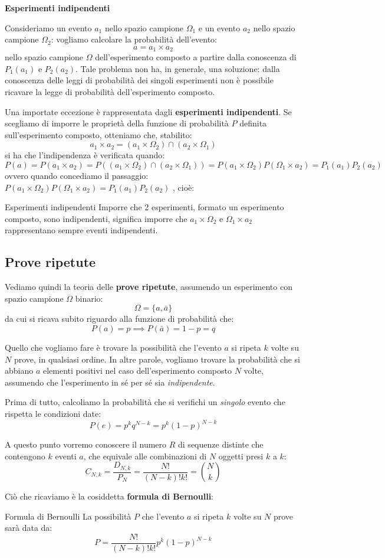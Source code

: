 \documentclass[a4paper,11pt]{article}
\begin{document}
\par\smallskip

\noindent
\textbf{\textsf{Esperimenti indipendenti}}

\noindent
Consideriamo un evento $a_1$ nello spazio campione $\Omega_1$ e un evento $a_2$ nello spazio campione $\Omega_2$: vogliamo calcolare la probabilità dell’evento:
$$
a = a_1 \times a_2
$$
nello spazio campione $\Omega$ dell'esperimento composto a partire dalla conoscenza di $P_1(a_1)$ e $P_2(a_2)$. Tale problema non ha, in generale, una soluzione: dalla conoscenza delle leggi di probabilità dei singoli esperimenti non è possibile ricavare la legge di probabilità dell’esperimento composto. 

Una importate eccezione è rappresentata dagli \textbf{esperimenti indipendenti}. Se scegliamo di imporre le proprietà della funzione di probabilità $P$ definita sull'esperimento composto, otteniamo che, stabilito:
$$
a_1 \times a_2 = (a_1 \times \Omega_2) \cap (a_2 \times \Omega_1)
$$
si ha che l'indipendenza è verificata quando:
$$
P(a) = P(a_1 \times a_2) = P((a_1 \times \Omega_2) \cap (a_2 \times \Omega_1)) = P(a_1 \times \Omega_2) P(\Omega_1 \times a_2) = P_1(a_1) P_2(a_2)
$$
ovvero quando concediamo il passaggio:
$
P(a_1 \times \Omega_2) P(\Omega_1 \times a_2) = P_1(a_1) P_2(a_2)
$
, cioè:
\begin{theorem}{Esperimenti indipendenti}
Imporre che 2 esperimenti, formato un esperimento composto, sono indipendenti, significa imporre che $a_1 \times \Omega_2$ e $\Omega_1 \times a_2$ rappresentano sempre eventi indipendenti.
\end{theorem}

\subsection{Prove ripetute}
Vediamo quindi la teoria delle \textbf{prove ripetute}, assumendo un esperimento con spazio campione $\Omega$ binario:
$$
\Omega = \{ a, \bar{a} \}
$$
da cui si ricava subito riguardo alla funzione di probabilità che:
$$
P(a) = p \implies P(\bar{a}) = 1 - p = q
$$

Quello che vogliamo fare è trovare la possibilità che l'evento $a$ si ripeta $k$ volte su $N$ prove, in qualsiasi ordine. In altre parole, vogliamo trovare la probabilità che si abbiano $a$ elementi positivi nel caso dell'esperimento composto $N$ volte, assumendo che l'esperimento in sé per sé sia \textit{indipendente}.

Prima di tutto, calcoliamo la probabilità che si verifichi un \textit{singolo} evento che rispetta le condizioni date:
$$
P(e) = p^k q^{N - k} = p^k (1 - p)^{N - k}
$$

A questo punto vorremo conoscere il numero $R$ di sequenze distinte che contengono $k$ eventi $a$, che equivale alle combinazioni di $N$ oggetti presi $k$ a $k$:
$$
C_{N, k} = \frac{D_{N, k}}{P_N} = \frac{N!}{(N - k)! k!} = \binom{N}{k}
$$

Ciò che ricaviamo è la cosiddetta \textbf{formula di Bernoulli}:
\begin{theorem}{Formula di Bernoulli}
La possibilità $P$ che l'evento $a$ si ripeta $k$ volte su $N$ prove sarà data da:
$$
P = \frac{N!}{(N - k)! k!} p^k (1 - p)^{N - k}
$$
\end{theorem}
\end{document}
